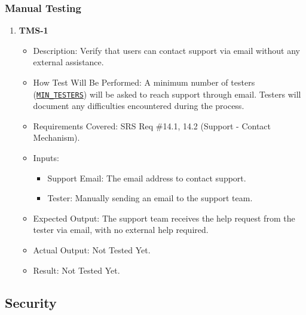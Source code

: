 \documentclass[12pt, titlepage]{article}
\begin{document}
\subsubsection{Manual Testing}
\begin{enumerate}
    \item \textbf{TMS-1}  
    \begin{itemize}
        \item Description: Verify that users can contact support via email without any external assistance.
        \item How Test Will Be Performed: A minimum number of testers (\hyperref[MIN_TESTERS]{\texttt{MIN\_TESTERS}}) will be asked to reach support through email. Testers will document any difficulties encountered during the process.
        \item Requirements Covered: SRS Req \#14.1, 14.2 (Support - Contact Mechanism).
        \item Inputs:  
            \begin{itemize}
                \item Support Email: The email address to contact support.
                \item Tester: Manually sending an email to the support team.
            \end{itemize}
        \item Expected Output: The support team receives the help request from the tester via email, with no external help required.
        \item Actual Output: Not Tested Yet.
        \item Result: Not Tested Yet.
    \end{itemize}
\end{enumerate}

\subsection{Security}
\end{document}
